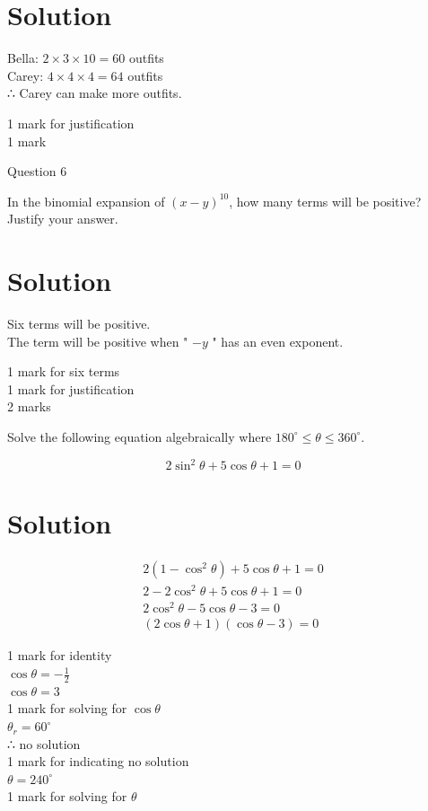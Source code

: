 \documentclass[10pt]{article}
\begin{document}
\section*{Solution}
Bella: $2 \times 3 \times 10=60$ outfits\\
Carey: $4 \times 4 \times 4=64$ outfits\\
∴ Carey can make more outfits.

1 mark for justification\\
1 mark

Question 6

In the binomial expansion of $(x-y)^{10}$, how many terms will be positive?\\
Justify your answer.

\section*{Solution}
Six terms will be positive.\\
The term will be positive when " $-y$ " has an even exponent.

1 mark for six terms\\
1 mark for justification\\
2 marks

Solve the following equation algebraically where $180^{\circ} \leq \theta \leq 360^{\circ}$.

$$
2 \sin ^{2} \theta+5 \cos \theta+1=0
$$

\section*{Solution}
$$
\begin{array}{r}
2\left(1-\cos ^{2} \theta\right)+5 \cos \theta+1=0 \\
2-2 \cos ^{2} \theta+5 \cos \theta+1=0 \\
2 \cos ^{2} \theta-5 \cos \theta-3=0 \\
(2 \cos \theta+1)(\cos \theta-3)=0
\end{array}
$$

1 mark for identity\\
$\cos \theta=-\frac{1}{2}$\\
$\cos \theta=3$\\
1 mark for solving for $\cos \theta$\\
$\theta_{r}=60^{\circ}$\\
∴ no solution\\
1 mark for indicating no solution\\
$\theta=240^{\circ}$\\
1 mark for solving for $\theta$
\end{document}

